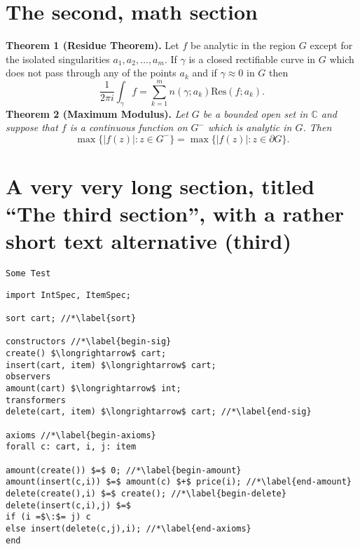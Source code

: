 \documentclass[]{usiinfthesis}
\begin{document}
 \section{The second, math section}
\begin{center}
\end{center}

\textbf{Theorem 1 (Residue Theorem).}
Let $f$ be analytic in the region $G$ except for the isolated singularities $a_1,a_2,\ldots,a_m$. If $\gamma$ is a closed rectifiable curve in $G$ which does not pass through any of the points $a_k$ and if $\gamma\approx 0$ in $G$ then
\[
\frac{1}{2\pi i}\int_\gamma f = \sum_{k=1}^m n(\gamma;a_k) \text{Res}(f;a_k).
\]
\textbf{Theorem 2 (Maximum Modulus).}
\emph{Let $G$ be a bounded open set in $\mathbb{C}$ and suppose that $f$ is a continuous function on $G^-$ which is analytic in $G$. Then}
\[
\max\{|f(z)|:z\in G^-\}=\max \{|f(z)|:z\in \partial G \}.
\]

\section[third]{A very very long section, titled ``The third section'', with
  a rather  short text alternative (third)}
\lipsum \texttt{Some Test}
\begin{lstlisting}
import IntSpec, ItemSpec;

sort cart; //*\label{sort}

constructors //*\label{begin-sig}
create() $\longrightarrow$ cart;
insert(cart, item) $\longrightarrow$ cart;
observers
amount(cart) $\longrightarrow$ int;
transformers
delete(cart, item) $\longrightarrow$ cart; //*\label{end-sig}

axioms //*\label{begin-axioms}
forall c: cart, i, j: item 

amount(create()) $=$ 0; //*\label{begin-amount}
amount(insert(c,i)) $=$ amount(c) $+$ price(i); //*\label{end-amount}
delete(create(),i) $=$ create(); //*\label{begin-delete}
delete(insert(c,i),j) $=$
if (i =$\:$= j) c
else insert(delete(c,j),i); //*\label{end-axioms}
end
\end{lstlisting}
\end{document}
